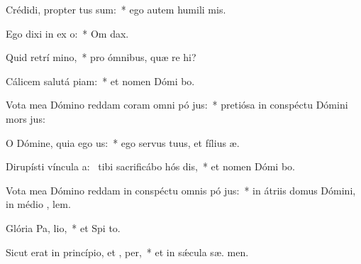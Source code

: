 \item Crédidi, propter  tus sum:~* ego autem humili  mis.
\item Ego dixi in ex o:~* Om  dax.
\item Quid retrí mino,~* pro ómnibus, quæ re hi?
\item Cálicem salutá piam:~* et nomen Dómi bo.
\item Vota mea Dómino reddam coram omni pó jus:~* pretiósa in conspéctu Dómini mors  jus:
\item O Dómine, quia ego  us:~* ego servus tuus, et fílius  æ.
\item Dirupísti víncula a:~\pscross{} tibi sacrificábo hós dis,~* et nomen Dómi bo.
\item Vota mea Dómino reddam in conspéctu omnis pó jus:~* in átriis domus Dómini, in médio , lem.
\item Glória Pa,  lio,~* et Spi to.
\item Sicut erat in princípio, et ,  per,~* et in sǽcula sæ. men.

